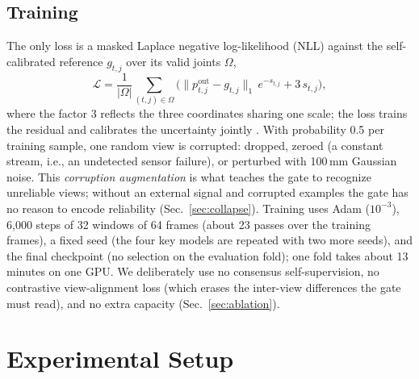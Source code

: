 \documentclass[journal]{IEEEtran}
\begin{document}
\subsection{Training}
\label{sec:training}
The only loss is a masked Laplace negative log-likelihood (NLL) against the self-calibrated reference $g_{t,j}$ over its valid joints $\Omega$,
\begin{equation}
\mathcal{L} = \frac{1}{|\Omega|}\sum_{(t,j)\in\Omega} \Big( \|p^{\mathrm{out}}_{t,j}-g_{t,j}\|_1 \, e^{-s_{t,j}} + 3\, s_{t,j} \Big),
\label{eq:nll}
\end{equation}
where the factor 3 reflects the three coordinates sharing one scale; the loss trains the residual and calibrates the uncertainty jointly \cite{kendall2017uncertainties}. With probability 0.5 per training sample, one random view is corrupted: dropped, zeroed (a constant stream, i.e., an undetected sensor failure), or perturbed with 100\,mm Gaussian noise. This \emph{corruption augmentation} is what teaches the gate to recognize unreliable views; without an external signal and corrupted examples the gate has no reason to encode reliability (Sec.~\ref{sec:collapse}). Training uses Adam ($10^{-3}$), 6{,}000 steps of 32 windows of 64 frames (about 23 passes over the training frames), a fixed seed (the four key models are repeated with two more seeds), and the final checkpoint (no selection on the evaluation fold); one fold takes about 13 minutes on one GPU. We deliberately use no consensus self-supervision, no contrastive view-alignment loss (which erases the inter-view differences the gate must read), and no extra capacity (Sec.~\ref{sec:ablation}).

\section{Experimental Setup}
\label{sec:experiments}
\end{document}
